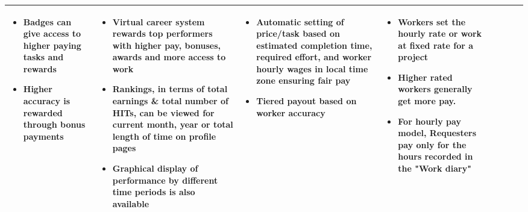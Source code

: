 \documentclass{sigchi}
\begin{document}
\begin{sidewaystable*}
\begin{tabular}[h]{| p{1.5cm}| p{2.7cm}| p{2.7cm}| p{2.7cm}| p{2.7cm}| p{2.7cm}| p{2.7cm}| p{2.7cm}|}
{\begin{itemize} [noitemsep,nolistsep]
\item  Badges can give access to higher paying tasks and rewards
\item  Higher accuracy is rewarded through bonus payments
\end{itemize}
} &
{
\begin{itemize} [noitemsep,nolistsep]
\item  Virtual career system rewards top performers with higher pay, bonuses, awards and more access to work
\item  Rankings, in terms of total earnings \& total number of HITs, can be viewed for current month, year or total length of time on profile pages
\item  Graphical display of performance by different time periods is also available
\end{itemize}
} &
{
\begin{itemize} [noitemsep,nolistsep]
\item  Automatic setting of price/task based on estimated completion time, required effort, and worker hourly wages in local time zone ensuring fair pay
\item  Tiered payout based on worker accuracy
\end{itemize}
} &
{
\begin{itemize} [noitemsep,nolistsep]
\item  Workers set the hourly rate or work at fixed rate for a project
\item  Higher rated workers generally get more pay.
\item  For hourly pay model, Requesters pay only for the hours recorded in the "Work diary"
\end{itemize}
} \\ 
\hline


 


\end{tabular}
\end{sidewaystable*}
\end{document}
